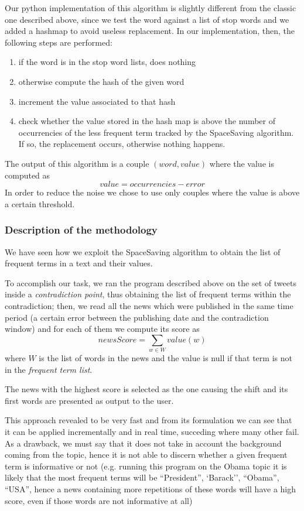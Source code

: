 Our python implementation of this algorithm is slightly different from the
classic one described above, since we test the word against a list of stop words
and we added a hashmap to avoid useless
replacement. In our implementation, then, the following steps are performed:
\begin{enumerate}
	\item if the word is in the stop word lists, does nothing
	\item otherwise compute the hash of the given word
	\item increment the value associated to that hash
	\item check whether the value stored in the hash map is above the number of
		occurrencies of the less frequent term tracked by the SpaceSaving
		algorithm. If so, the replacement occurs, otherwise nothing happens.
\end{enumerate}
The output of this algorithm is a couple $(word, value)$ where the value is
computed as 
\begin{displaymath}
	value = occurrencies - error
\end{displaymath}
In order to reduce the noise we chose to use only couples where the value is
above a certain threshold.

\subsubsection*{Description of the methodology}
We have seen how we exploit the SpaceSaving algorithm to obtain the list of
frequent terms in a text and their
values. 

To accomplish our task, we ran the program described above on the set of tweets inside a
\emph{contradiction point}, thus obtaining the list of frequent terms within the
contradiction; then, we read all the news which were published in the same time
period (a certain error between the publishing date and the contradiction
window) and for each of them we compute its score as
\begin{displaymath}
	newsScore = \sum_{w \in W} value(w)
\end{displaymath}
where $W$ is the list of words in the news and the value is null if that term is
not in the \emph{frequent term list}.

The news with the highest score is selected as the one causing the shift and its
first words are presented as output to the user.

This approach revealed to be very fast and from its formulation we can see that
it can be applied incrementally and in real time, succeding where many other fail. As a drawback, we must say that it does not
take in account the background coming from the topic, hence it is not able to
discern whether a given frequent term is informative or not (e.g. running this
program on the Obama topic it is likely that the most
frequent terms will be ``President'', `Barack'', ``Obama'', ``USA'', hence a
news containing more repetitions of these words will have a high score, even if
those words are not informative at all)
